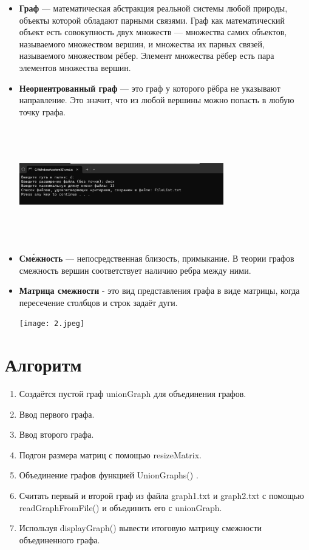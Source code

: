 \documentclass[12pt]{article}
\begin{document}
\begin{itemize}
    \item \textbf{Граф} —  математическая абстракция реальной системы любой природы, объекты которой обладают парными связями. Граф как математический объект есть совокупность двух множеств — множества самих объектов, называемого множеством вершин, и множества их парных связей, называемого множеством рёбер. Элемент множества рёбер есть пара элементов множества вершин.
    
    
    \item \textbf{Неориентрованный граф} — это граф у которого рёбра не указывают направление. Это значит, что из любой вершины можно попасть в любую точку графа.
    
    
     \includegraphics[width=0.7\textwidth, height=5cm, keepaspectratio]{1.png}
     
    \item \textbf{Сме́жность} — непосредственная близость, примыкание. В теории графов смежность вершин соответствует наличию ребра между ними.
    
    \item \textbf{Матрица смежности} - это вид представления графа в виде матрицы, когда пересечение столбцов и строк задаёт дуги.
    
        \texttt{[image: 2.jpeg]}
        
\end{itemize}

\section*{Алгоритм}
\begin{enumerate}
    \item Создаётся пустой граф unionGraph для объединения графов.
    \item Ввод первого графа.
    \item Ввод второго графа.
    \item Подгон размера матриц с помощью resizeMatrix.
    \item Объединение графов функцией UnionGraphs() .
    \item Считать первый и второй граф из файла graph1.txt и graph2.txt с помощью readGraphFromFile() и объединить его с unionGraph.
    \item Используя displayGraph() вывести итоговую матрицу смежности объединенного графа.
    
\end{enumerate}
\end{document}
